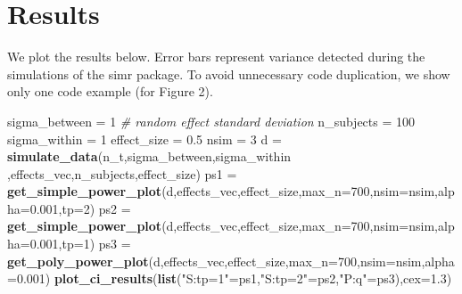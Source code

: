 \documentclass[]{article}
\newenvironment{Shaded}{\begin{snugshade}}{\end{snugshade}}
\newcommand{\KeywordTok}[1]{\textcolor[rgb]{0.13,0.29,0.53}{\textbf{#1}}}
\newcommand{\DataTypeTok}[1]{\textcolor[rgb]{0.13,0.29,0.53}{#1}}
\newcommand{\DecValTok}[1]{\textcolor[rgb]{0.00,0.00,0.81}{#1}}
\newcommand{\FloatTok}[1]{\textcolor[rgb]{0.00,0.00,0.81}{#1}}
\newcommand{\StringTok}[1]{\textcolor[rgb]{0.31,0.60,0.02}{#1}}
\newcommand{\CommentTok}[1]{\textcolor[rgb]{0.56,0.35,0.01}{\textit{#1}}}
\newcommand{\NormalTok}[1]{#1}
\begin{document}
\newpage

\section{Results}\label{results}

We plot the results below. Error bars represent variance detected during
the simulations of the simr package. To avoid unnecessary code
duplication, we show only one code example (for Figure 2).

\begin{Shaded}
\begin{Highlighting}[]
\NormalTok{sigma_between =}\StringTok{ }\DecValTok{1} \CommentTok{# random effect standard deviation}
\NormalTok{n_subjects =}\StringTok{ }\DecValTok{100}
\NormalTok{sigma_within =}\StringTok{ }\DecValTok{1}
\NormalTok{effect_size =}\StringTok{ }\FloatTok{0.5}
\NormalTok{nsim =}\StringTok{ }\DecValTok{3}
\NormalTok{d =}\StringTok{ }\KeywordTok{simulate_data}\NormalTok{(n_t,sigma_between,sigma_within ,effects_vec,n_subjects,effect_size)}
\NormalTok{ps1 =}\StringTok{ }\KeywordTok{get_simple_power_plot}\NormalTok{(d,effects_vec,effect_size,}\DataTypeTok{max_n=}\DecValTok{700}\NormalTok{,}\DataTypeTok{nsim=}\NormalTok{nsim,}\DataTypeTok{alpha=}\FloatTok{0.001}\NormalTok{,}\DataTypeTok{tp=}\DecValTok{2}\NormalTok{)}
\NormalTok{ps2 =}\StringTok{ }\KeywordTok{get_simple_power_plot}\NormalTok{(d,effects_vec,effect_size,}\DataTypeTok{max_n=}\DecValTok{700}\NormalTok{,}\DataTypeTok{nsim=}\NormalTok{nsim,}\DataTypeTok{alpha=}\FloatTok{0.001}\NormalTok{,}\DataTypeTok{tp=}\DecValTok{1}\NormalTok{)}
\NormalTok{ps3 =}\StringTok{ }\KeywordTok{get_poly_power_plot}\NormalTok{(d,effects_vec,effect_size,}\DataTypeTok{max_n=}\DecValTok{700}\NormalTok{,}\DataTypeTok{nsim=}\NormalTok{nsim,}\DataTypeTok{alpha=}\FloatTok{0.001}\NormalTok{)}
\KeywordTok{plot_ci_results}\NormalTok{(}\KeywordTok{list}\NormalTok{(}\StringTok{"S:tp=1"}\NormalTok{=ps1,}\StringTok{"S:tp=2"}\NormalTok{=ps2,}\StringTok{"P:q"}\NormalTok{=ps3),}\DataTypeTok{cex=}\FloatTok{1.3}\NormalTok{)}
\end{Highlighting}
\end{Shaded}
\end{document}
